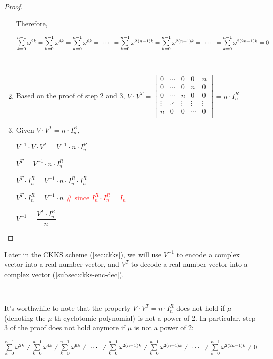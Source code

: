 \begin{proof}
\begin{enumerate}
Therefore,

$\sum\limits_{k=0}^{n-1} \omega^{2k} = \sum\limits_{k=0}^{n-1} \omega^{4k} = \sum\limits_{k=0}^{n-1} \omega^{6k} = \text{ } \text{$\cdots$} \text{ } = \sum\limits_{k=0}^{n-1} \omega^{2(n-1)k} = \sum\limits_{k=0}^{n-1} \omega^{2(n+1)k} = \text{ } \text{$\cdots$} \text{ } = \sum\limits_{k=0}^{n-1} \omega^{2(2n-1)k} = 0$

$ $

\item Based on the proof of step 2 and 3, $V \cdot V^T = 
\begin{bmatrix}
0 & \cdots & 0 & 0 & n\\
0 & \cdots & 0 & n & 0\\
0 & \cdots & n & 0 & 0\\
\vdots & \iddots & \vdots & \vdots & \vdots \\
n & 0 & 0 & \cdots & 0\\
\end{bmatrix} = n \cdot I_n^R$

\item Given $V \cdot V^T = n \cdot I_n^R$, 

$V^{-1} \cdot V \cdot V^T = V^{-1} \cdot n \cdot I_n^R$

$V^T = V^{-1} \cdot n \cdot I_n^R$

$V^T \cdot I_n^R = V^{-1} \cdot n \cdot I_n^R  \cdot I_n^R$

$V^T \cdot I_n^R = V^{-1} \cdot n$ \textcolor{red}{\text{ } \# since $I_n^R  \cdot I_n^R = I_n$}

$V^{-1} = \dfrac{V^T \cdot I_n^R}{n}$

\end{enumerate}
\end{proof}

Later in the CKKS scheme (\autoref{sec:ckks}), we will use $V^{-1}$ to encode a complex vector into a real number vector, and $V^T$ to decode a real number vector into a complex vector (\autoref{subsec:ckks-enc-dec}).

$ $

 It's worthwhile to note that the property $V\cdot V^T = n\cdot I_n^R$ does not hold if $\mu$ (denoting the $\mu$-th cyclotomic polynomial) is not a power of 2. In particular, step 3 of the proof does not hold anymore if $\mu$ is not a power of 2:

$\sum\limits_{k=0}^{n-1} \omega^{2k} \neq \sum\limits_{k=0}^{n-1} \omega^{4k} \neq \sum\limits_{k=0}^{n-1} \omega^{6k} \neq \text{ } \text{$\cdots$} \text{ } \neq \sum\limits_{k=0}^{n-1} \omega^{2(n-1)k} \neq \sum\limits_{k=0}^{n-1} \omega^{2(n+1)k} \neq \text{ } \text{$\cdots$} \text{ } \neq \sum\limits_{k=0}^{n-1} \omega^{2(2n-1)k} \neq 0$
